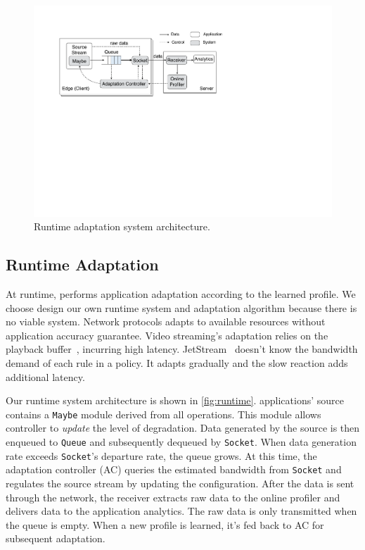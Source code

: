\begin{figure}
  \centering
  \includegraphics[width=\linewidth]{figures/runtime-adaptation.pdf}
  \caption{Runtime adaptation system architecture.}
  \label{fig:runtime}
\end{figure}

\subsection{Runtime Adaptation}
\label{sec:runtime}

At runtime, \sysname{} performs application adaptation according to the learned
profile. We choose design our own runtime system and adaptation algorithm
because there is no viable system. Network protocols adapts to available
resources without application accuracy guarantee. Video streaming's adaptation
relies on the playback buffer~\cite{huang2014buffer}, incurring high
latency. JetStream~\cite{rabkin2014aggregation} doesn't know the bandwidth
demand of each rule in a policy. It adapts gradually and the slow reaction adds
additional latency.

Our runtime system architecture is shown in \autoref{fig:runtime}. \sysname{}
applications' source contains a \texttt{Maybe} module derived from all \maybe{}
operations. This module allows controller to \textit{update} the level of
degradation. Data generated by the source is then enqueued to \texttt{Queue} and
subsequently dequeued by \texttt{Socket}. When data generation rate exceeds
\texttt{Socket}'s departure rate, the queue grows. At this time, the adaptation
controller (AC) queries the estimated bandwidth from \texttt{Socket} and
regulates the source stream by updating the configuration.  After the data is
sent through the network, the receiver extracts raw data to the online profiler
and delivers data to the application analytics. The raw data is only transmitted
when the queue is empty. When a new profile is learned, it's fed back to AC for
subsequent adaptation.

